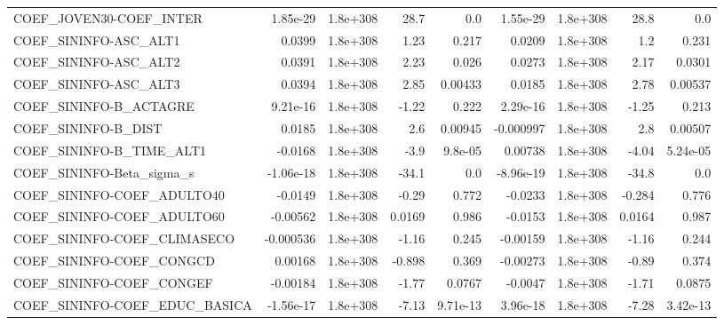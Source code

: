 \begin{tabular}{lrrrrrrrr}
COEF\_JOVEN30-COEF\_INTER           &    1.85e-29 &     1.8e+308 &      28.7 &      0.0 &   1.55e-29 &    1.8e+308 &         28.8 &           0.0 \\
COEF\_SININFO-ASC\_ALT1             &      0.0399 &     1.8e+308 &      1.23 &    0.217 &     0.0209 &    1.8e+308 &          1.2 &         0.231 \\
COEF\_SININFO-ASC\_ALT2             &      0.0391 &     1.8e+308 &      2.23 &    0.026 &     0.0273 &    1.8e+308 &         2.17 &        0.0301 \\
COEF\_SININFO-ASC\_ALT3             &      0.0394 &     1.8e+308 &      2.85 &  0.00433 &     0.0185 &    1.8e+308 &         2.78 &       0.00537 \\
COEF\_SININFO-B\_ACTAGRE            &    9.21e-16 &     1.8e+308 &     -1.22 &    0.222 &   2.29e-16 &    1.8e+308 &        -1.25 &         0.213 \\
COEF\_SININFO-B\_DIST               &      0.0185 &     1.8e+308 &       2.6 &  0.00945 &  -0.000997 &    1.8e+308 &          2.8 &       0.00507 \\
COEF\_SININFO-B\_TIME\_ALT1          &     -0.0168 &     1.8e+308 &      -3.9 &  9.8e-05 &    0.00738 &    1.8e+308 &        -4.04 &      5.24e-05 \\
COEF\_SININFO-Beta\_sigma\_s         &   -1.06e-18 &     1.8e+308 &     -34.1 &      0.0 &  -8.96e-19 &    1.8e+308 &        -34.8 &           0.0 \\
COEF\_SININFO-COEF\_ADULTO40        &     -0.0149 &     1.8e+308 &     -0.29 &    0.772 &    -0.0233 &    1.8e+308 &       -0.284 &         0.776 \\
COEF\_SININFO-COEF\_ADULTO60        &    -0.00562 &     1.8e+308 &    0.0169 &    0.986 &    -0.0153 &    1.8e+308 &       0.0164 &         0.987 \\
COEF\_SININFO-COEF\_CLIMASECO       &   -0.000536 &     1.8e+308 &     -1.16 &    0.245 &   -0.00159 &    1.8e+308 &        -1.16 &         0.244 \\
COEF\_SININFO-COEF\_CONGCD          &     0.00168 &     1.8e+308 &    -0.898 &    0.369 &   -0.00273 &    1.8e+308 &        -0.89 &         0.374 \\
COEF\_SININFO-COEF\_CONGEF          &    -0.00184 &     1.8e+308 &     -1.77 &   0.0767 &    -0.0047 &    1.8e+308 &        -1.71 &        0.0875 \\
COEF\_SININFO-COEF\_EDUC\_BASICA     &   -1.56e-17 &     1.8e+308 &     -7.13 & 9.71e-13 &   3.96e-18 &    1.8e+308 &        -7.28 &      3.42e-13 \\

\end{tabular}
